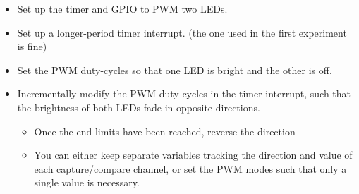 \documentclass[11pt,fleqn]{book} %
\begin{document}
\begin{itemize}
    \item Set up the timer and GPIO to PWM two LEDs.
    \item Set up a longer-period timer interrupt. (the one used in the first experiment is fine)
    \item Set the PWM duty-cycles so that one LED is bright and the other is off.
    \item Incrementally modify the PWM duty-cycles in the timer interrupt, such that the brightness of both LEDs fade in opposite directions. 
    \begin{itemize}
        \item Once the end limits have been reached, reverse the direction
        \item You can either keep separate variables tracking the direction and value of each capture/compare channel, or set the PWM modes such that only a single value is necessary.
    \end{itemize}
\end{itemize}
 
\end{document}
